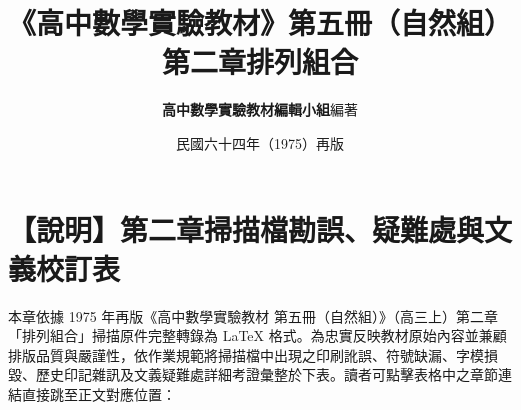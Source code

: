\documentclass[a4paper,12pt,twoside]{article}
\title{\LARGE\textbf{《高中數學實驗教材》第五冊（自然組）}\\[0.5em] \Large\textbf{第二章\quad 排列組合}}
\author{\textbf{高中數學實驗教材編輯小組}\quad 編著}
\date{民國六十四年（1975）再版}
\begin{document}
\maketitle
\thispagestyle{firstpage}

\section*{【說明】第二章掃描檔勘誤、疑難處與文義校訂表}
\label{sec:errata_notes_b5_ch2}

本章依據 1975 年再版《高中數學實驗教材 第五冊（自然組）》（高三上）第二章「排列組合」掃描原件完整轉錄為 \LaTeX{} 格式。為忠實反映教材原始內容並兼顧排版品質與嚴謹性，依作業規範將掃描檔中出現之印刷訛誤、符號缺漏、字模損毀、歷史印記雜訊及文義疑難處詳細考證彙整於下表。讀者可點擊表格中之章節連結直接跳至正文對應位置：
\end{document}
